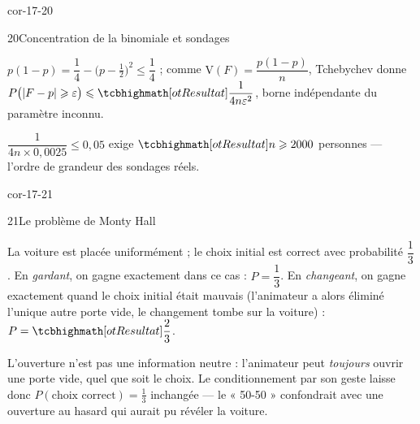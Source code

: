 \begin{blocLivre}{cor-17-20}
\begin{corrige}{20}{Concentration de la binomiale et sondages}
\begin{questions}
  \item $p(1-p)=\dfrac14-\bigl(p-\tfrac12\bigr)^{2}\leqslant\dfrac14$ ;
    comme $\mathrm{V}(F)=\dfrac{p(1-p)}{n}$, Tchebychev donne
    $P\bigl(|F-p|\geqslant\varepsilon\bigr)
    \leqslant\res{\dfrac{1}{4n\varepsilon^{2}}}$, borne indépendante du
    paramètre inconnu.
  \item $\dfrac{1}{4n\times0{,}0025}\leqslant0{,}05$ exige
    $\res{n\geqslant2000}$ personnes — l'ordre de grandeur des sondages
    réels.
\end{questions}
\end{corrige}
\end{blocLivre}

\begin{blocLivre}{cor-17-21}
\begin{corrige}{21}{Le problème de Monty Hall}
\begin{questions}
  \item La voiture est placée uniformément ; le choix initial est correct
    avec probabilité $\dfrac13$. En \emph{gardant}, on gagne exactement
    dans ce cas : $P=\dfrac13$. En \emph{changeant}, on gagne exactement
    quand le choix initial était mauvais (l'animateur a alors éliminé
    l'unique autre porte vide, le changement tombe sur la voiture) :
    $P=\res{\dfrac23}$.
  \item L'ouverture n'est pas une information neutre : l'animateur peut
    \emph{toujours} ouvrir une porte vide, quel que soit le choix. Le
    conditionnement par son geste laisse donc
    $P(\text{choix correct})=\frac13$ inchangée — le « 50-50 »
    confondrait avec une ouverture au hasard qui aurait pu révéler la
    voiture.
\end{questions}
\end{corrige}
\end{blocLivre}

